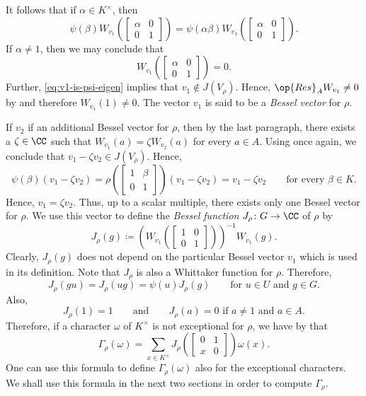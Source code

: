 \documentclass[../main.tex]{subfiles}
\begin{document}
It follows that if $\alpha\in K^\times$, then
\[\psi(\beta)W_{v_1}\left(\begin{bmatrix}
	\alpha & 0 \\
	0 & 1
\end{bmatrix}\right)=\psi(\alpha\beta)W_{v_1}\left(\begin{bmatrix}
	\alpha & 0 \\
	0 & 1
\end{bmatrix}\right).\]
If $\alpha\ne1$, then we may conclude that
\[W_{v_1}\left(\begin{bmatrix}
	\alpha & 0 \\
	0 & 1
\end{bmatrix}\right)=0.\]
Further, \eqref{eq:v1-is-psi-eigen} implies that $v_1\notin J(V_\rho)$. Hence, $\op{Res}_AW_{v_1}\ne0$ by  and therefore $W_{v_1}(1)\ne0$. The vector $v_1$ is said to be a \textit{Bessel vector} for $\rho$.

If $v_2$ if an additional Bessel vector for $\rho$, then by the last paragraph, there exists a $\zeta\in\CC$ such that $W_{v_1}(a)=\zeta W_{v_2}(a)$ for every $a\in A$. Using  once again, we conclude that $v_1-\zeta v_2\in J(V_\rho)$. Hence,
\[\psi(\beta)(v_1-\zeta v_2)=\rho\left(\begin{bmatrix}
	1 & \beta \\
	0 & 1
\end{bmatrix}\right)(v_1-\zeta v_2)=v_1-\zeta v_2\qquad\text{for every }\beta\in K.\]
Hence, $v_1=\zeta v_2$. Thus, up to a scalar multiple, there exists only one Bessel vector for $\rho$. We use this vector to define the \textit{Bessel function} $J_\rho\colon G\to\CC$ of $\rho$ by
\[J_\rho(g)\coloneqq\left(W_{v_1}\left(\begin{bmatrix}
	1 & 0 \\
	0 & 1
\end{bmatrix}\right)\right)^{-1}W_{v_1}(g).\]
Clearly, $J_\rho(g)$ does not depend on the particular Bessel vector $v_1$ which is used in its definition. Note that $J_\rho$ is also a Whittaker function for $\rho$. Therefore,
\[J_\rho(gu)=J_\rho(ug)=\psi(u)J_\rho(g)\qquad\text{for }u\in U\text{ and }g\in G.\]
Also,
\begin{equation}
	J_\rho(1)=1\qquad\text{and}\qquad J_\rho(a)=0\text{ if }a\ne1\text{ and }a\in A. \label{eq:bessel-on-a}
\end{equation}
Therefore, if a character $\omega$ of $K^\times$ is not exceptional for $\rho$, we have by  that
\begin{equation}
	\Gamma_\rho(\omega)=\sum_{x\in K^\times}J_\rho\left(\begin{bmatrix}
		0 & 1 \\
		x & 0
	\end{bmatrix}\right)\omega(x). \label{eq:general-gamma}
\end{equation}
One can use this formula to define $\Gamma_\rho(\omega)$ also for the exceptional characters. We shall use this formula in the next two sections in order to compute $\Gamma_\rho$.
\end{document}

